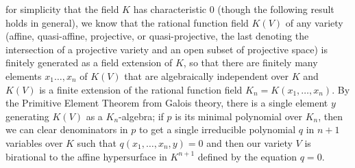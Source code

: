 \documentclass[10pt]{article}
\begin{document}
for simplicity that the field $K$ has characteristic 0 (though the
following result holds in general), we know that the rational function
field $K(V)$ of any variety (affine, quasi-affine, projective, or
quasi-projective, the last denoting the intersection of a projective
variety and an open subset of projective space) is finitely generated as
a field extension of $K$, so that there are finitely many elements
$x_1\ldots,x_n$ of $K(V)$ that are algebraically independent over $K$
and $K(V)$ is a finite extension of the rational function field
$K_n=K(x_1,\ldots,x_n)$. By the Primitive Element Theorem from Galois
theory, there is a single element $y$ generating $K(V)$ as a
$K_n$-algebra; if $p$ is its minimal polynomial over $K_n$, then we can
clear denominators in $p$ to get a single irreducible polynomial $q$ in
$n+1$ variables over $K$ such that $q(x_1,\ldots,x_n,y) = 0$ and then
our variety $V$ is birational to the affine hypersurface in $K^{n+1}$
defined by the equation $q=0$.
\end{document}
